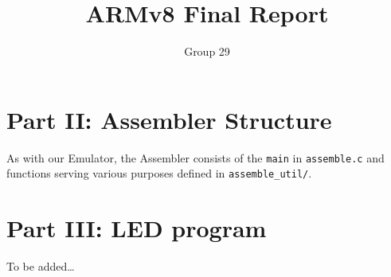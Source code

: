 \documentclass[11pt]{article}
\begin{document}
\title{ARMv8 Final Report}
\author{Group 29}

\maketitle

\section{Part II: Assembler Structure}

As with our Emulator, the Assembler consists of the \texttt{main} in \texttt{assemble.c} and functions serving various purposes defined in \texttt{assemble_util/}.

\section{Part III: LED program}

To be added\dots
\end{document}
